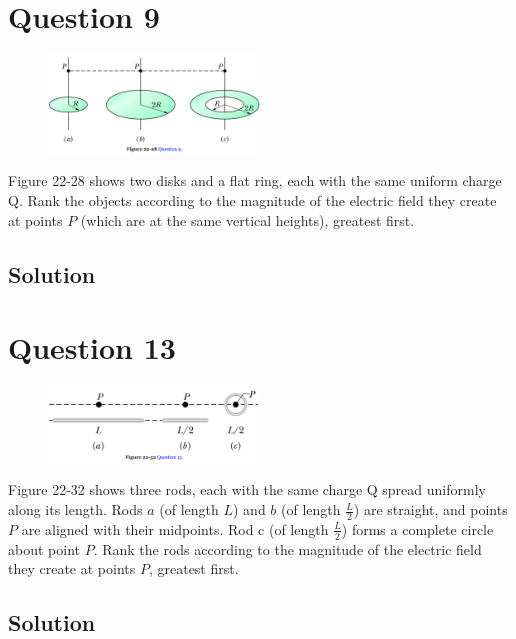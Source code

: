 \documentclass[12pt]{article}
\begin{document}
\pagebreak
\section{Question 9}
\begin{figure}
    \vspace{-30pt}
    \includegraphics[width=0.5\textwidth]{picture_3.png} 
\end{figure}
Figure 22-28 shows two disks and a flat ring, each with the same uniform charge Q. Rank the objects according to the magnitude of the electric field they create at points $P$ (which are at the same vertical heights), greatest first.

\subsection*{Solution}


\pagebreak
\section{Question 13}
\begin{figure}
    \vspace{-30pt}
    \includegraphics[width=0.5\textwidth]{picture_4.png} 
\end{figure}
Figure 22-32 shows three rods, each with the same charge Q spread uniformly along its length. Rods $a$ (of length $L$) and $b$ (of length $\frac{L}{2}$) are straight, and points $P$ are aligned with their midpoints. Rod c (of length $\frac{L}{2}$) forms a complete circle about point $P$. Rank the rods according to the magnitude of the electric field they create at points $P$, greatest first.

\subsection*{Solution}
\end{document}

